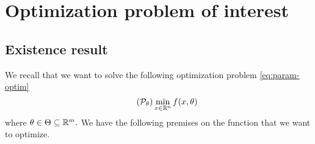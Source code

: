 

\section{ Optimization problem of interest}\label{sec:opt-prblm}
\subsection{Existence result}\label{subsec:exist}
We recall  that we want to solve the following optimization problem \eqref{eq:param-optim}
\begin{equation*}\tag{$\calP_{\theta}$} \label{eq:param-optim}
\min_{x\in\bbR^n}f(x,\theta)
\end{equation*}
where $\theta\in\Theta \subseteq\mathbb{R}^m.$  We have the following premises on the function that we want to optimize. 

